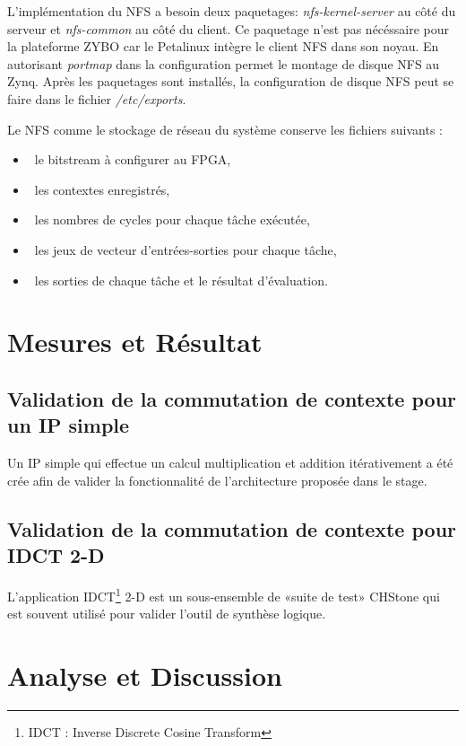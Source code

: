 L'implémentation du NFS a besoin deux paquetages: \emph{nfs-kernel-server} au côté du serveur et \emph{nfs-common} au côté du client.
Ce paquetage n'est pas nécéssaire pour la plateforme ZYBO car le Petalinux intègre le client NFS dans son noyau.
En autorisant \emph{portmap} dans la configuration permet le montage de disque NFS au Zynq. Après les paquetages sont installés,
la configuration de disque NFS peut se faire dans le fichier \emph{/etc/exports}.

Le NFS comme le stockage de réseau du système conserve les fichiers suivants :
\begin{itemize}
	\item\ le bitstream à configurer au FPGA,
	\item\ les contextes enregistrés,
	\item\ les nombres de cycles pour chaque tâche exécutée,
	\item\ les jeux de vecteur d'entrées-sorties pour chaque tâche,
	\item\ les sorties de chaque tâche et le résultat d'évaluation.
\end{itemize}

\section{Mesures et Résultat}
\subsection{Validation de la commutation de contexte pour un IP simple}
Un IP simple qui effectue un calcul multiplication et addition itérativement a été crée afin de valider la fonctionnalité de 
l'architecture proposée dans le stage.

\subsection{Validation de la commutation de contexte pour IDCT 2-D}

L'application IDCT\footnote{IDCT : Inverse Discrete Cosine Transform} 2-D est un sous-ensemble de «suite de test» CHStone
qui est souvent utilisé pour valider l'outil de synthèse logique.


\section{Analyse et Discussion}

